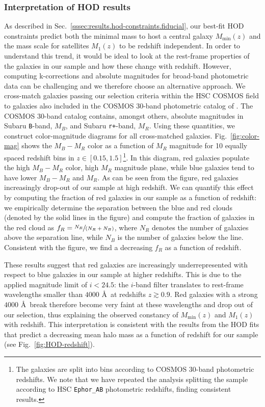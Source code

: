 \documentclass[a4paper,11pt]{article}
\begin{document}
    \subsubsection{Interpretation of HOD results}\label{sssec:results.hod-constraints.constraints-interpretation}
      As described in Sec.~\ref{sssec:results.hod-constraints.fiducial}, our best-fit HOD constraints predict both the minimal mass to host a central galaxy $M_{\mathrm{min}}(z)$ and the mass scale for satellites $M_{1}(z)$ to be redshift independent. In order to understand this trend, it would be ideal to look at the rest-frame properties of the galaxies in our sample and how these change with redshift. However, computing k-corrections and absolute magnitudes for broad-band photometric data can be challenging and we therefore choose an alternative approach. We cross-match galaxies passing our selection criteria within the HSC COSMOS field to galaxies also included in the COSMOS 30-band photometric catalog of \cite{2016ApJS..224...24L}. The COSMOS 30-band catalog contains, amongst others, absolute magnitudes in Subaru \texttt{B}-band, $M_{B}$, and Subaru \texttt{r+}-band, $M_{R}$. Using these quantities, we construct color-magnitude diagrams for all cross-matched galaxies. Fig.~\ref{fig:color-mag} shows the $M_{B}-M_{R}$ color as a function of $M_{R}$ magnitude for 10 equally spaced redshift bins in $z \in [0.15, 1.5]$\footnote{The galaxies are split into bins according to COSMOS 30-band photometric redshifts. We note that we have repeated the analysis splitting the sample according to HSC \texttt{Ephor\_AB} photometric redshifts, finding consistent results.}. In this diagram, red galaxies populate the high $M_{B}-M_{R}$ color, high $M_{R}$ magnitude plane, while blue galaxies tend to have lower $M_{B}-M_{R}$ and $M_{R}$. As can be seen from the figure, red galaxies increasingly drop-out of our sample at high redshift. We can quantify this effect by computing the fraction of red galaxies in our sample as a function of redshift: we empirically determine the separation between the blue and red clouds (denoted by the solid lines in the figure) and compute the fraction of galaxies in the red cloud as $f_{R} = \sfrac{N_{R}}{(N_{R}+N_{B})}$, where $N_{R}$ denotes the number of galaxies above the separation line, while $N_{B}$ is the number of galaxies below the line. Consistent with the figure, we find a decreasing $f_{R}$ as a function of redshift.
      
      These results suggest that red galaxies are increasingly underrepresented with respect to blue galaxies in our sample at higher redshifts. This is due to the applied magnitude limit of $i < 24.5$: the $i$-band filter translates to rest-frame wavelengths smaller than $4000$ \AA \, at redshifts $z \gtrsim 0.9$. Red galaxies with a strong $4000$ \AA \, break therefore become very faint at these wavelengths and drop out of our selection, thus explaining the observed constancy of $M_{\mathrm{min}}(z)$ and $M_{1}(z)$ with redshift. This interpretation is consistent with the results from the HOD fits that predict a decreasing mean halo mass as a function of redshift for our sample (see Fig.~\ref{fig:HOD-redshift}).
\end{document}
